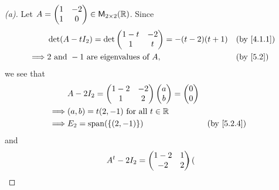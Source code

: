 \begin{proof}[(a)]
  Let \(A = \begin{pmatrix}
    1 & -2 \\
    1 & 0
  \end{pmatrix} \in \mathsf{M}_{{2} \times 2}({\mathbb{R}})\).
  Since
  \begin{align*}
             & \det(A - t I_2) = \det\begin{pmatrix}
                                       1 - t & -2 \\
                                       1     & t
                                     \end{pmatrix} = -(t - 2)(t + 1)            &  & \text{(by \cref{4.1.1})} \\
    \implies & 2 \text{ and } -1 \text{ are eigenvalues of } A, &  & \text{(by \cref{5.2})}
  \end{align*}
  we see that
  \begin{align*}
             & A - 2I_2 = \begin{pmatrix}
                            1 - 2 & -2 \\
                            1     & 2
                          \end{pmatrix} \begin{pmatrix}
                                          a \\
                                          b
                                        \end{pmatrix} = \begin{pmatrix}
                                                          0 \\
                                                          0
                                                        \end{pmatrix}                   \\
    \implies & (a, b) = t(2, -1) \text{ for all } t \in \R                               \\
    \implies & E_2 = \spn{\set{(2, -1)}}                   &  & \text{(by \cref{5.2.4})}
  \end{align*}
  and
  \begin{align*}
             & {A}^{t} - 2I_2 = \begin{pmatrix}
                                 1 - 2 & 1 \\
                                 -2    & 2
                               \end{pmatrix} \begin{pmatrix}

\end{pmatrix}
\end{align*}
\end{proof}
